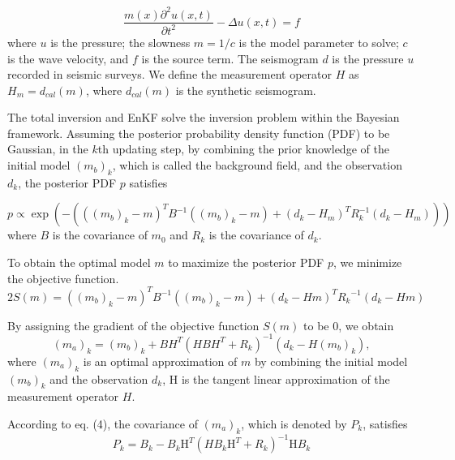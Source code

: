 \documentclass[mreferee]{gji}
\begin{document}
\begin{equation}
\frac{m(x)\partial ^2{u}(x,t)}{\partial{t^2}}-\Delta u(x,t)=f
\end{equation}
where $u$ is the pressure; the slowness $m=1/c$ is the model parameter to solve; $c$ is the wave velocity, and $f$ is the source term. The seismogram $d$ is the pressure $u$ recorded in seismic surveys. We define the measurement operator $H$ as $H_m=d_{cal}(m)$, where $d_{cal}(m)$ is the synthetic seismogram.

The total inversion and EnKF solve the inversion problem within the Bayesian framework. Assuming the posterior probability density function (PDF) to be Gaussian, in the $k$th updating step, by combining the prior knowledge of the initial model $(m_b)_k$, which is called the background field, and the observation $d_k$, the posterior PDF $p$ satisfies


\begin{equation}
p \varpropto \exp\left ( -\left ( \left ( \left ( m_b \right )_k - m \right )^T B^{-1} \left ( \left ( m_b \right )_k -m\right ) +\left ( d_k-H_m \right )^TR_k^{-1}\left ( d_k-H_m \right )\right ) \right )
\end{equation}
where $B$ is the covariance of $m_0$ and $R_k$ is the covariance of $d_k$.

To obtain the optimal model $m$ to maximize the posterior PDF $p$, we minimize the objective function.
\begin{equation}
2S\left(m\right)=\left(\left(m_b\right)_k-m\right)^TB^{-1}\left(\left(m_b\right)_k-m\right)+\left(d_k-Hm\right)^T{R_k}^{-1}\left(d_k-Hm\right)
\end{equation}

By assigning the gradient of the objective function $S(m)$ to be 0, we obtain
\begin{equation}
(m_a)_k=(m_b)_k+BH^T(HBH^T+R_k)^{-1}(d_k-H(m_b)_k),
\end{equation}
where $(m_a)_k$ is an optimal approximation of $m$ by combining the initial model $(m_b)_k$ and the observation $d_k$, H is the tangent linear approximation of the measurement operator $H$.

According to eq. (4), the covariance of $(m_a)_k$, which is denoted by $P_k$, satisfies
\begin{equation}
P_k=B_k-B_k\mbox{H}^T(HB_k\mbox{H}^T+R_k)^{-1}\mbox{H}B_k
\end{equation}
\end{document}
